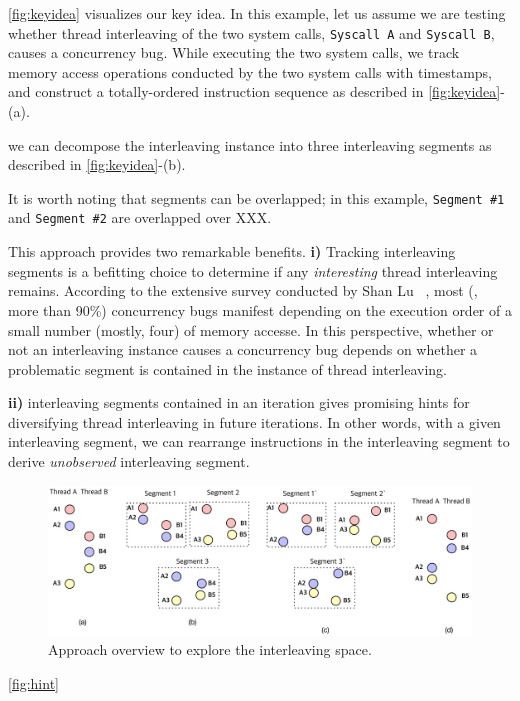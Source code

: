 \autoref{fig:keyidea} visualizes our key idea.
%
In this example, let us assume we are testing whether thread
interleaving of the two system calls, \texttt{Syscall A} and
\texttt{Syscall B}, causes a concurrency bug.
%
While executing the two system calls, we track memory access
operations conducted by the two system calls with timestamps, and
construct a totally-ordered instruction sequence as described in
\autoref{fig:keyidea}-(a).

we can decompose the interleaving instance into three interleaving
segments as described in \autoref{fig:keyidea}-(b).


It is worth noting that segments can be overlapped; in this example,
\texttt{Segment \#1} and \texttt{Segment \#2} are overlapped over XXX.





%
This approach provides two remarkable benefits.
%
\textbf{i)} Tracking interleaving segments is a befitting choice to
determine if any \textit{interesting} thread interleaving remains.
%
According to the extensive survey conducted by Shan Lu
\etal~\cite{learningfrommistakes}, most (\ie, more than 90\%)
concurrency bugs manifest depending on the execution order of a small
number (mostly, four) of memory accesse.
%
In this perspective, whether or not an interleaving instance causes a
concurrency bug depends on whether a problematic segment is contained
in the instance of thread interleaving.
%

\textbf{ii)} interleaving segments contained in an iteration gives
promising hints for diversifying thread interleaving in future
iterations.
%
In other words, with a given interleaving segment, we can rearrange
instructions in the interleaving segment to derive \textit{unobserved}
interleaving segment.

\begin{figure}[t]
  \includegraphics[width=0.9\linewidth]{fig/intuition.pdf}
  \caption{Approach overview to explore the interleaving
    space.}
  \label{fig:hint}
\end{figure}
%
\autoref{fig:hint} 


